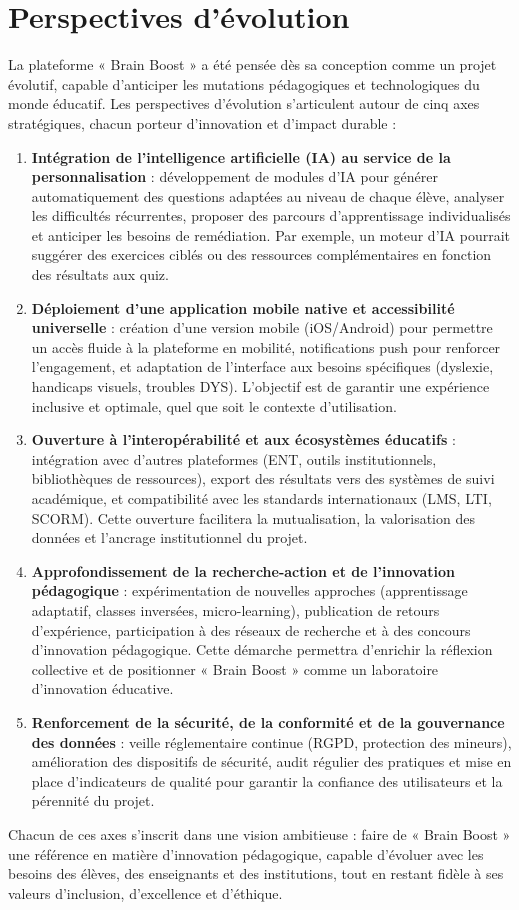 \documentclass[a4paper,11pt]{report}
\begin{document}
\section{Perspectives d'évolution}
La plateforme « Brain Boost » a été pensée dès sa conception comme un projet évolutif, capable d'anticiper les mutations pédagogiques et technologiques du monde éducatif. Les perspectives d'évolution s'articulent autour de cinq axes stratégiques, chacun porteur d'innovation et d'impact durable :
\begin{enumerate}
    \item \textbf{Intégration de l'intelligence artificielle (IA) au service de la personnalisation} : développement de modules d'IA pour générer automatiquement des questions adaptées au niveau de chaque élève, analyser les difficultés récurrentes, proposer des parcours d'apprentissage individualisés et anticiper les besoins de remédiation. Par exemple, un moteur d'IA pourrait suggérer des exercices ciblés ou des ressources complémentaires en fonction des résultats aux quiz.
    \item \textbf{Déploiement d'une application mobile native et accessibilité universelle} : création d'une version mobile (iOS/Android) pour permettre un accès fluide à la plateforme en mobilité, notifications push pour renforcer l'engagement, et adaptation de l'interface aux besoins spécifiques (dyslexie, handicaps visuels, troubles DYS). L'objectif est de garantir une expérience inclusive et optimale, quel que soit le contexte d'utilisation.
    \item \textbf{Ouverture à l'interopérabilité et aux écosystèmes éducatifs} : intégration avec d'autres plateformes (ENT, outils institutionnels, bibliothèques de ressources), export des résultats vers des systèmes de suivi académique, et compatibilité avec les standards internationaux (LMS, LTI, SCORM). Cette ouverture facilitera la mutualisation, la valorisation des données et l'ancrage institutionnel du projet.
    \item \textbf{Approfondissement de la recherche-action et de l'innovation pédagogique} : expérimentation de nouvelles approches (apprentissage adaptatif, classes inversées, micro-learning), publication de retours d'expérience, participation à des réseaux de recherche et à des concours d'innovation pédagogique. Cette démarche permettra d'enrichir la réflexion collective et de positionner « Brain Boost » comme un laboratoire d'innovation éducative.
    \item \textbf{Renforcement de la sécurité, de la conformité et de la gouvernance des données} : veille réglementaire continue (RGPD, protection des mineurs), amélioration des dispositifs de sécurité, audit régulier des pratiques et mise en place d'indicateurs de qualité pour garantir la confiance des utilisateurs et la pérennité du projet.
\end{enumerate}
Chacun de ces axes s'inscrit dans une vision ambitieuse : faire de « Brain Boost » une référence en matière d'innovation pédagogique, capable d'évoluer avec les besoins des élèves, des enseignants et des institutions, tout en restant fidèle à ses valeurs d'inclusion, d'excellence et d'éthique.
\end{document}
